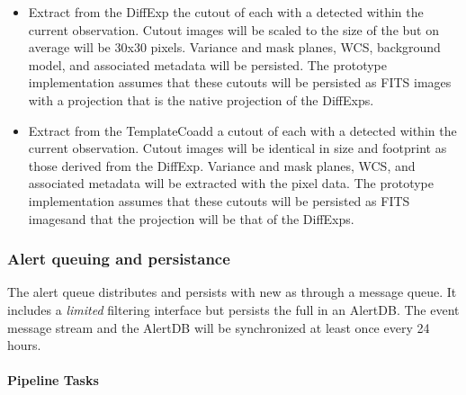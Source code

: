  \begin{itemize}
\item Extract from the DiffExp the cutout of each \DIAObject with a \DIASource detected within the current observation.  Cutout images will be scaled to the size of the \DIASource but on average will be 30x30 pixels. Variance and mask planes, WCS, background model, and associated metadata will be persisted. The prototype implementation assumes that these cutouts will be persisted as FITS images with a projection that is the  native projection of the DiffExps.

\item Extract from the TemplateCoadd  a cutout of each \DIAObject with a \DIASource detected within the current observation.  Cutout images will be identical in size and footprint as those derived from the DiffExp. Variance and mask planes, WCS, and associated metadata will be extracted with the pixel data. The prototype implementation assumes that these cutouts will be persisted as FITS imagesand that the projection will be that of  the DiffExps.
\end{itemize}

\subsubsection{Alert queuing and persistance}
\label{sec:apQueue}

The alert queue  distributes and persists \DIAObject with new \DIASources as \VOEvents through a message queue. It includes a {\it limited} filtering interface but persists the full \VOEvents in an AlertDB. The event message stream and the AlertDB will be  synchronized at least once every 24 hours.


\paragraph{Pipeline Tasks}

